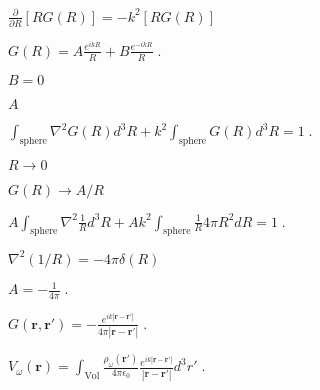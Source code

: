 \documentclass[12pt]{article}
\renewcommand{\vec}[1]{\boldsymbol{#1}}%
\def\lthtmlcheckvsize{\ifdim\ht\sizebox<\vsize 
  \ifdim\wd\sizebox<\hsize\expandafter\hfill\fi \expandafter\vfill
  \else\expandafter\vss\fi}%
\begin{document}
{\newpage\clearpage
{}%
$\displaystyle \frac{\partial}{\partial R}[RG(R)] =- k^2 [R G(R)]$%
\lthtmlindisplaymathZ
\lthtmlcheckvsize\clearpage}

{\newpage\clearpage
{}%
$\displaystyle G(R) = A \frac{e^{ikR}}{R} + B \frac{e^{-ikR}}{R} \;.$%
\lthtmlindisplaymathZ
\lthtmlcheckvsize\clearpage}

{\newpage\clearpage
{}%
$ B=0$%
\lthtmlindisplaymathZ
\lthtmlcheckvsize\clearpage}

{\newpage\clearpage
{}%
$ A$%
\lthtmlindisplaymathZ
\lthtmlcheckvsize\clearpage}

{\newpage\clearpage
{}%
$\displaystyle \int_{\text{sphere}}\nabla^2 G(R) d^3R  + k^2 \int_\text{sphere} G(R) d^3R = 1 \;.$%
\lthtmlindisplaymathZ
\lthtmlcheckvsize\clearpage}

{\newpage\clearpage
{}%
$ R\rightarrow 0$%
\lthtmlindisplaymathZ
\lthtmlcheckvsize\clearpage}

{\newpage\clearpage
{}%
$ G(R) \rightarrow A/R$%
\lthtmlindisplaymathZ
\lthtmlcheckvsize\clearpage}

{\newpage\clearpage
{}%
$\displaystyle A \int_{\text{sphere}}\nabla^2 \frac{1}{R} d^3R  + A k^2 \int_\text{sphere} \frac{1}{R} 4\pi R^2dR = 1 \;.$%
\lthtmlindisplaymathZ
\lthtmlcheckvsize\clearpage}

{\newpage\clearpage
{}%
$ \nabla^2 (1/R) = -4\pi \delta(R)$%
\lthtmlindisplaymathZ
\lthtmlcheckvsize\clearpage}

{\newpage\clearpage
{}%
$\displaystyle A = -\frac{1}{4\pi} \;.$%
\lthtmlindisplaymathZ
\lthtmlcheckvsize\clearpage}

{\newpage\clearpage
{}%
$\displaystyle G(\vec{r}, \vec{r}') = - \frac{e^{ik|\vec{r}-\vec{r}'|}}{4\pi
|\vec{r}-\vec{r}'|} \;.$%
\lthtmlindisplaymathZ
\lthtmlcheckvsize\clearpage}

{\newpage\clearpage
{}%
$\displaystyle V_\omega(\vec{r}) = \int_{\text{Vol}} \frac{\rho_\omega(\vec{r}')}{4\pi \epsilon_0} \frac{e^{ik|\vec{r}-\vec{r}'|}}{ |\vec{r}-\vec{r}'|} d^3 r'\;.$%
\lthtmlindisplaymathZ
\lthtmlcheckvsize\clearpage}
\end{document}
